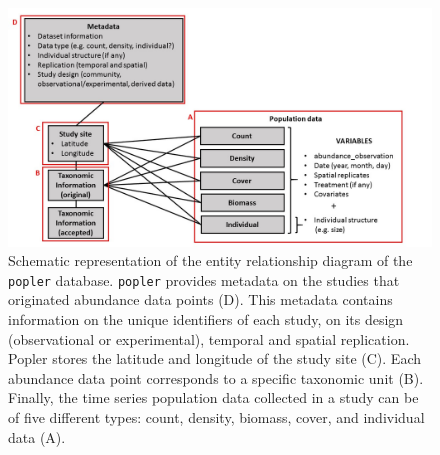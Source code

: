 \documentclass{article}\usepackage[]{graphicx}\usepackage[]{color}
\begin{document}
\newpage
\begin{figure}[h!]
  \begin{center}
    \includegraphics[scale=0.4]{schema}
    \caption{Schematic representation of the entity relationship diagram of the \texttt{popler} database. \texttt{popler} provides metadata on the studies that originated abundance data points (D). This metadata contains information on the unique identifiers of each study, on its design (observational or experimental), temporal and spatial replication. Popler stores the latitude and longitude of the study site (C). Each abundance data point corresponds to a specific taxonomic unit (B). Finally, the time series population data collected in a study can be of five different types: count, density, biomass, cover, and individual data (A).}
    \label{Fig:schema}
  \end{center}
\end{figure}
\end{document}

